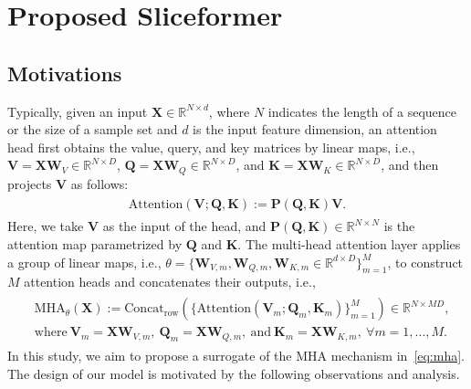 \section{Proposed Sliceformer}\label{sec:model}
\subsection{Motivations}
Typically, given an input $\bm{X}\in\mathbb{R}^{N\times d}$, where $N$ indicates the length of a sequence or the size of a sample set and $d$ is the input feature dimension, an attention head first obtains the value, query, and key matrices by linear maps, i.e., $\bm{V}=\bm{X}\bm{W}_V\in\mathbb{R}^{N\times D}$, $\bm{Q}=\bm{X}\bm{W}_Q\in\mathbb{R}^{N\times D}$, and $\bm{K}=\bm{X}\bm{W}_K\in\mathbb{R}^{N\times D}$, and then projects $\bm{V}$ as follows:
\begin{eqnarray}\label{eq:att}
\begin{aligned}
    \text{Attention}(\bm{V};\bm{Q},\bm{K}):=\bm{P}(\bm{Q},\bm{K})\bm{V}. 
\end{aligned}
\end{eqnarray}
Here, we take $\bm{V}$ as the input of the head, and $\bm{P}(\bm{Q},\bm{K})\in\mathbb{R}^{N\times N}$ is the attention map parametrized by $\bm{Q}$ and $\bm{K}$. 
The multi-head attention layer applies a group of linear maps, i.e., $\theta=\{\bm{W}_{V,m},\bm{W}_{Q,m},\bm{W}_{K,m}\in\mathbb{R}^{d\times D}\}_{m=1}^{M}$, to construct $M$ attention heads and concatenates their outputs, i.e.,
\begin{eqnarray}\label{eq:mha}
\begin{aligned}
    &\text{MHA}_{\theta}(\bm{X}) := \text{Concat}_{\text{row}}(\{\text{Attention}(\bm{V}_m;\bm{Q}_m,\bm{K}_m)\}_{m=1}^{M})\in\mathbb{R}^{N\times MD},\\
    &\text{where}~\bm{V}_m=\bm{X}\bm{W}_{V,m},~\bm{Q}_m=\bm{X}\bm{W}_{Q,m},~\text{and}~\bm{K}_m=\bm{X}\bm{W}_{K,m},~\forall m=1,...,M.
\end{aligned}
\end{eqnarray}
In this study, we aim to propose a surrogate of the MHA mechanism in~\eqref{eq:mha}. 
The design of our model is motivated by the following observations and analysis. 

